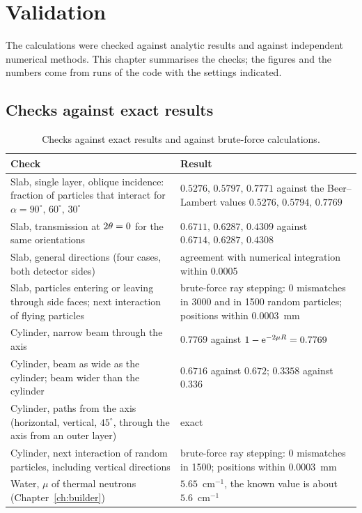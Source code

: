 \chapter{Validation}
\label{ch:validation}

The calculations were checked against analytic results and against independent numerical methods. This chapter summarises the checks;
the figures and the numbers come from runs of the code with the settings indicated.

\section{Checks against exact results}

\begin{table}[ht]
  \centering\small
  \begin{tabular}{@{}p{7.2cm}p{7.5cm}@{}}
    \toprule \textbf{Check} & \textbf{Result} \\ \midrule
    Slab, single layer, oblique incidence: fraction of particles that interact for $\alpha=90^\circ,\,60^\circ,\,30^\circ$ & $0.5276,\,0.5797,\,0.7771$ against the Beer--Lambert values $0.5276,\,0.5794,\,0.7769$ \\
    Slab, transmission at $2\theta=0$ for the same orientations & $0.6711,\,0.6287,\,0.4309$ against $0.6714,\,0.6287,\,0.4308$ \\
    Slab, general directions (four cases, both detector sides) & agreement with numerical integration within 0.0005 \\
    Slab, particles entering or leaving through side faces; next interaction of flying particles & brute-force ray stepping: 0 mismatches in 3000 and in 1500 random particles; positions within 0.0003~mm \\
    Cylinder, narrow beam through the axis & $0.7769$ against $1-\operatorname{e}^{-2\mu R}=0.7769$ \\
    Cylinder, beam as wide as the cylinder; beam wider than the cylinder & $0.6716$ against $0.672$; $0.3358$ against $0.336$ \\
    Cylinder, paths from the axis (horizontal, vertical, $45^\circ$, through the axis from an outer layer) & exact \\
    Cylinder, next interaction of random particles, including vertical directions & brute-force ray stepping: 0 mismatches in 1500; positions within 0.0003~mm \\
    Water, $\mu$ of thermal neutrons (Chapter~\ref{ch:builder}) & $5.65$~cm$^{-1}$, the known value is about $5.6$~cm$^{-1}$ \\ \bottomrule
  \end{tabular}
  \caption{Checks against exact results and against brute-force calculations.}
\end{table}

